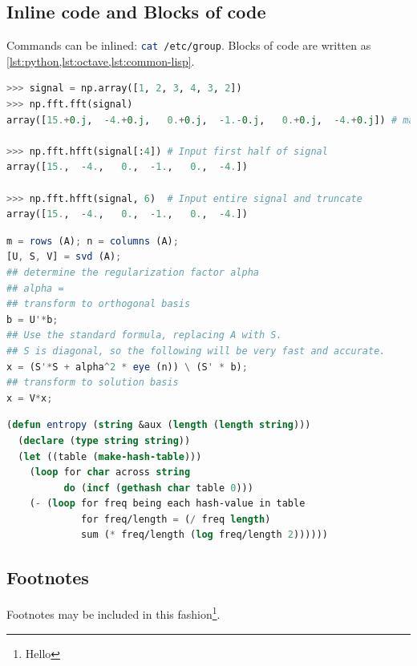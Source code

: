 \subsection{Inline code and Blocks of code}
Commands can be inlined: \lstinline[style=mystyle,language=sh]{cat /etc/group}.
Blocks of code are written as \cref{lst:python,lst:octave,lst:common-lisp}.

\begin{lstlisting}[language=Python,
                   caption={Python code sample \cite{numpy-hfft}.},
                   label={lst:python}]
>>> signal = np.array([1, 2, 3, 4, 3, 2])
>>> np.fft.fft(signal)
array([15.+0.j,  -4.+0.j,   0.+0.j,  -1.-0.j,   0.+0.j,  -4.+0.j]) # may vary

>>> np.fft.hfft(signal[:4]) # Input first half of signal
array([15.,  -4.,   0.,  -1.,   0.,  -4.])

>>> np.fft.hfft(signal, 6)  # Input entire signal and truncate
array([15.,  -4.,   0.,  -1.,   0.,  -4.])
\end{lstlisting}

\begin{lstlisting}[language=Octave,
                   caption={Octave code sample \cite{octave-example}.},
                   label={lst:octave}]
m = rows (A); n = columns (A);
[U, S, V] = svd (A);
## determine the regularization factor alpha
## alpha =
## transform to orthogonal basis
b = U'*b;
## Use the standard formula, replacing A with S.
## S is diagonal, so the following will be very fast and accurate.
x = (S'*S + alpha^2 * eye (n)) \ (S' * b);
## transform to solution basis
x = V*x;
\end{lstlisting}

\begin{lstlisting}[language=Lisp,
                   caption={Common Lisp code sample
                            \cite{common-lisp-example}.},
                   label={lst:common-lisp}]
(defun entropy (string &aux (length (length string)))
  (declare (type string string))
  (let ((table (make-hash-table)))
    (loop for char across string
          do (incf (gethash char table 0)))
    (- (loop for freq being each hash-value in table
             for freq/length = (/ freq length)
             sum (* freq/length (log freq/length 2))))))
\end{lstlisting}

\subsection{Footnotes}
Footnotes may be included in this fashion\footnote{Hello}.

